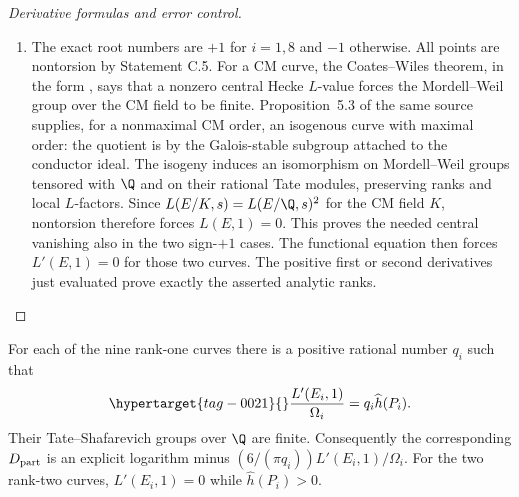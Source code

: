 \begin{proof}[Derivative formulas and error control]
\begin{enumerate}[label=\arabic*.,leftmargin=*]
\item The exact root numbers are $+1$ for $i=1,8$ and $-1$ otherwise.
All points are nontorsion by Statement C.5. For a CM curve,
the Coates--Wiles theorem, in the form
\citet[Theorem 10.1]{CrRubin1999}, says that a nonzero central
Hecke $L$-value forces the Mordell--Weil group over the CM field
to be finite. Proposition~5.3 of the same source supplies, for a nonmaximal CM order, an isogenous
curve with maximal order: the quotient is by the Galois-stable subgroup attached to the conductor ideal. The isogeny induces an isomorphism on Mordell--Weil groups tensored with $\Q$ and on their rational Tate modules, preserving ranks and local $L$-factors.
Since $L(E/K,s)=L(E/\Q,s)^2$ for the CM field $K$, nontorsion
therefore forces $L(E,1)=0$. This proves the needed central
vanishing also in the two sign-$+1$ cases. The functional equation
then forces $L'(E,1)=0$ for those two curves. The positive first
or second derivatives just evaluated prove exactly the asserted
analytic ranks.
\end{enumerate}

\end{proof}

\begin{proposition}\hypertarget{tag-0012}{}\label{ari:C.6.R3}

For each of the nine rank-one curves there is a positive rational
number $q_i$ such that
\begin{equation}\hypertarget{tag-0021}{}\label{ari:eq:Cr-rational-factor}
 \frac{L'(E_i,1)}{\Omega_i}=q_i\widehat h(P_i).
\end{equation}
Their Tate--Shafarevich groups over $\Q$ are finite. Consequently
the corresponding $D_{\rm part}$ is an explicit logarithm minus
$(6/(\pi q_i))L'(E_i,1)/\Omega_i$. For the two rank-two curves, $L'(E_i,1)=0$ while
$\widehat h(P_i)>0$.
\end{proposition}


